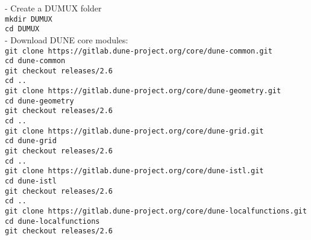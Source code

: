 - Create a DUMUX folder\\
\lstinline{mkdir DUMUX}\\
\lstinline{cd DUMUX}\\
- Download DUNE core modules:\\
\texttt{git clone https://gitlab.dune-project.org/core/dune-common.git}\\
    \hspace{\parindent} \texttt{cd dune-common}\\
    \hspace{\parindent} \texttt{git checkout releases/2.6}\\
		\hspace{\parindent} \texttt{cd ..}\\
\texttt{git clone https://gitlab.dune-project.org/core/dune-geometry.git}\\
    \hspace{\parindent} \texttt{cd dune-geometry}\\
    \hspace{\parindent} \texttt{git checkout releases/2.6}\\
		\hspace{\parindent} \texttt{cd ..}\\
\texttt{git clone https://gitlab.dune-project.org/core/dune-grid.git}\\
    \hspace{\parindent} \texttt{cd dune-grid}\\
    \hspace{\parindent} \texttt{git checkout releases/2.6}\\
		\hspace{\parindent} \texttt{cd ..}\\
\texttt{git clone https://gitlab.dune-project.org/core/dune-istl.git}\\
    \hspace{\parindent} \texttt{cd dune-istl}\\
    \hspace{\parindent} \texttt{git checkout releases/2.6}\\
		\hspace{\parindent} \texttt{cd ..}\\
\texttt{git clone https://gitlab.dune-project.org/core/dune-localfunctions.git}\\
    \hspace{\parindent} \texttt{cd dune-localfunctions}\\
    \hspace{\parindent} \texttt{git checkout releases/2.6}\\

